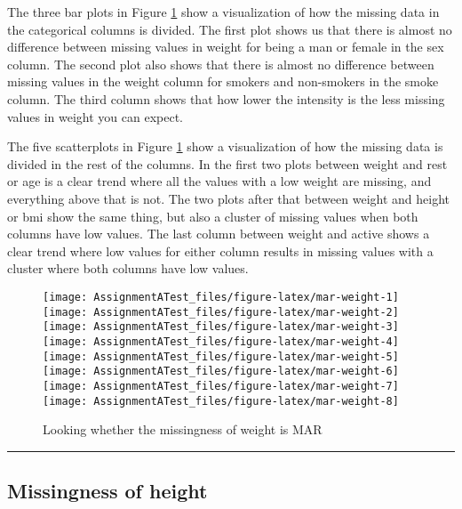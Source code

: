 \documentclass[
]{article}
\begin{document}
The three bar plots in Figure \ref{fig:mar-weight} show a visualization of how the missing data in the categorical columns is divided. The first plot shows us that there is almost no difference between missing values in weight for being a man or female in the sex column. The second plot also shows that there is almost no difference between missing values in the weight column for smokers and non-smokers in the smoke column. The third column shows that how lower the intensity is the less missing values in weight you can expect.

The five scatterplots in Figure \ref{fig:mar-weight} show a visualization of how the missing data is divided in the rest of the columns. In the first two plots between weight and rest or age is a clear trend where all the values with a low weight are missing, and everything above that is not. The two plots after that between weight and height or bmi show the same thing, but also a cluster of missing values when both columns have low values. The last column between weight and active shows a clear trend where low values for either column results in missing values with a cluster where both columns have low values.

\begin{figure}
\texttt{[image: AssignmentATest\_files/figure-latex/mar-weight-1]} \texttt{[image: AssignmentATest\_files/figure-latex/mar-weight-2]} \texttt{[image: AssignmentATest\_files/figure-latex/mar-weight-3]} \texttt{[image: AssignmentATest\_files/figure-latex/mar-weight-4]} \texttt{[image: AssignmentATest\_files/figure-latex/mar-weight-5]} \texttt{[image: AssignmentATest\_files/figure-latex/mar-weight-6]} \texttt{[image: AssignmentATest\_files/figure-latex/mar-weight-7]} \texttt{[image: AssignmentATest\_files/figure-latex/mar-weight-8]} \caption{Looking whether the missingness of weight is MAR}\label{fig:mar-weight}
\end{figure}

\begin{center}\rule{0.5\linewidth}{0.5pt}\end{center}

\hypertarget{missH}{%
\subsection{Missingness of height}\label{missH}}
\end{document}
